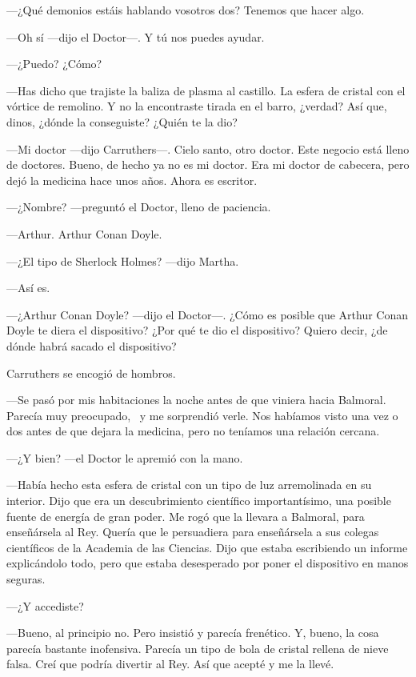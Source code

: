 ---¿Qué demonios estáis hablando vosotros dos? Tenemos que hacer algo.

---Oh sí ---dijo el Doctor---. Y tú nos puedes ayudar.

---¿Puedo? ¿Cómo?

---Has dicho que trajiste la baliza de plasma al castillo. La esfera de
cristal con el vórtice de remolino. Y no la encontraste tirada en el
barro, ¿verdad? Así que, dinos, ¿dónde la conseguiste? ¿Quién te la
dio?

---Mi doctor ---dijo Carruthers---. Cielo santo, otro doctor. Este
negocio está lleno de doctores. Bueno, de hecho ya no es mi doctor. Era
mi doctor de cabecera, pero dejó la medicina hace unos años. Ahora es
escritor.

---¿Nombre? ---preguntó el Doctor, lleno de paciencia.

---Arthur. Arthur Conan Doyle.

---¿El tipo de Sherlock Holmes? ---dijo Martha.

---Así es.

---¿Arthur Conan Doyle? ---dijo el Doctor---. ¿Cómo es posible que
Arthur Conan Doyle te diera el dispositivo? ¿Por qué te dio el
dispositivo? Quiero decir, ¿de dónde habrá sacado el dispositivo?

Carruthers se encogió de hombros.

---Se pasó por mis habitaciones la noche antes de que viniera hacia
Balmoral. Parecía muy preocupado, ~y me sorprendió verle. Nos habíamos
visto una vez o dos antes de que dejara la medicina, pero no teníamos
una relación cercana.

---¿Y bien? ---el Doctor le apremió con la mano.

---Había hecho esta esfera de cristal con un tipo de luz arremolinada en
su interior. Dijo que era un descubrimiento científico importantísimo,
una posible fuente de energía de gran poder. Me rogó que la llevara a
Balmoral, para enseñársela al Rey. Quería que le persuadiera para
enseñársela a sus colegas científicos de la Academia de las Ciencias.
Dijo que estaba escribiendo un informe explicándolo todo, pero que
estaba desesperado por poner el dispositivo en manos seguras.

---¿Y accediste?

---Bueno, al principio no. Pero insistió y parecía frenético. Y, bueno,
la cosa parecía bastante inofensiva. Parecía un tipo de bola de cristal
rellena de nieve falsa. Creí que podría divertir al Rey. Así que acepté
y me la llevé.

